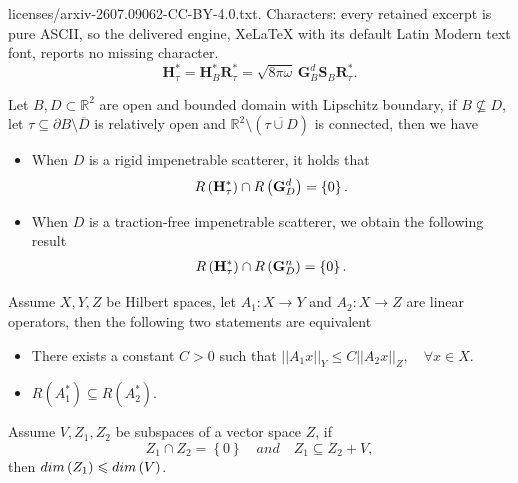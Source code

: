 \documentclass[10pt,a4paper]{amsart}
\begin{document}
licenses/arxiv-2607.09062-CC-BY-4.0.txt. Characters: every retained excerpt is pure ASCII, so the delivered engine, XeLaTeX with its default Latin Modern text font, reports no missing character.
\begin{equation}\label{eq:RestriH}
    \mathbf{H}_{\tau}^*
    =
    \mathbf{H}_B^* \mathbf{R}_{\tau}^*
    =
    \sqrt{8\pi\omega}\,\mathbf{G}_B^d \mathbf{S}_B \mathbf{R}_{\tau}^*.
\end{equation}

	\begin{thm}\label{RangeHG}
		Let $B, D \subset \mathbb R^2$ are open and bounded domain with Lipschitz  boundary, if $B \nsubseteq D$, let $\tau \subseteq \partial B \setminus \overline{D} $ is relatively open and $\mathbb R^2 \setminus \left( \overline{\tau \cup D }\right) $ is connected, then we have
			\begin{itemize}
				\item [(1).] When $D$ is a rigid impenetrable scatterer, it holds that
				\begin{align}\notag
					R\left( \mathbf H^*_{\tau} \right) \cap R\left( \mathbf G_D^d\right) =\left\lbrace 0\right\rbrace.
				\end{align}
				\item[(2).] When $D$ is a traction-free impenetrable scatterer, we obtain the following result
				\begin{align}\notag
					R\left( \mathbf H^*_{\tau} \right) \cap R\left( \mathbf G_D^n\right) =\left\lbrace 0\right\rbrace.
				\end{align}
			\end{itemize}
			
	\end{thm}

\begin{lem}\label{Inquallity}
	Assume $X, Y, Z$ be Hilbert spaces, let $A_1:X \to Y$ and $A_2: X \to Z$ are linear operators, then the following two statements are equivalent
	\begin{itemize}
		\item [(1).] There exists a constant $C>0$ such that $||A_1 x||_Y \leq C ||A_2 x||_Z, \quad \forall x \in X$.
		\item [(2).] $R \left( A^*_1 \right) \subseteq R \left( A^*_2 \right) $.
	\end{itemize}
\end{lem}

\begin{lem}\label{Dim}
	Assume $V, Z_1, Z_2 $ be subspaces of a vector space $Z$, if 
	$$
	Z_1 \cap Z_2= \left\lbrace 0 \right\rbrace \quad and \quad Z_1 \subseteq Z_2 +V,
	$$
	then $\rm {dim}\left(  Z_1 \right) \leqslant \rm {dim}\left(  V \right) $.
\end{lem}
\end{document}
